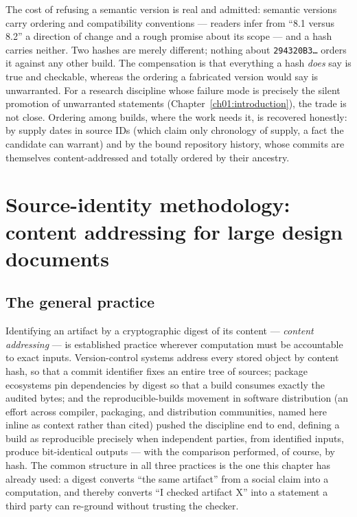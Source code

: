 The cost of refusing a semantic version is real and admitted: semantic
versions carry ordering and compatibility conventions --- readers infer
from ``8.1 versus 8.2'' a direction of change and a rough promise about
its scope --- and a hash carries neither. Two hashes are merely
different; nothing about
\texttt{294320B3\ldots} orders it against any other build. The
compensation is that everything a hash \emph{does} say is true and
checkable, whereas the ordering a fabricated version would say is
unwarranted. For a research discipline whose failure mode is precisely
the silent promotion of unwarranted statements (Chapter~\ref{ch01:introduction}),
the trade is not close. Ordering among builds, where the work needs it,
is recovered honestly: by supply dates in source IDs (which claim only
chronology of supply, a fact the candidate can warrant) and by the bound
repository history, whose commits are themselves content-addressed and
totally ordered by their ancestry.

\section{Source-identity methodology: content addressing for large design documents}\label{ch03:methodology}

\subsection{The general practice}\label{ch03:methodology:practice}

Identifying an artifact by a cryptographic digest of its content ---
\emph{content addressing} --- is established practice wherever
computation must be accountable to exact inputs. Version-control systems
address every stored object by content hash, so that a commit identifier
fixes an entire tree of sources; package ecosystems pin dependencies by
digest so that a build consumes exactly the audited bytes; and the
reproducible-builds movement in software distribution (an effort across
compiler, packaging, and distribution communities, named here inline as
context rather than cited) pushed the discipline end to end, defining a
build as reproducible precisely when independent parties, from identified
inputs, produce bit-identical outputs --- with the comparison performed,
of course, by hash. The common structure in all three practices is the
one this chapter has already used: a digest converts ``the same
artifact'' from a social claim into a computation, and thereby converts
``I checked artifact X'' into a statement a third party can re-ground
without trusting the checker.


